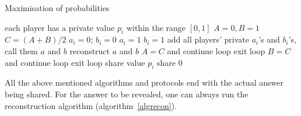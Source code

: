\begin{algorithm}
\caption{Maximisation of probabilities}
\label{algmax}
\begin{algorithmic}
\REQUIRE each player has a private value $p_{i}$ within the range $[0,1]$
\STATE $A = 0, B = 1$
\LOOP
\STATE $C = (A + B) / 2$
	\STATE $a_{i} = 0 $; $b_{i} = 0$
		\STATE $a_{i} = 1 $
	\ELSE
		\STATE $ b_{i} = 1$
	\ENDIF
	\STATE {}
	\STATE add all players' private $a_{i}$'s and $b_{i}$'s, call them $a$ and $b$
	\STATE reconstruct $a$ and $b$
		\STATE $A = C$ and continue loop
		\STATE exit loop 
		\STATE $B = C$ and continue loop
	\ELSE
		\STATE exit loop 
	\ENDIF
\ENDFOR
\ENDLOOP
\STATE {}
		\STATE share value $p_{i}$
	\ELSE
		\STATE share $0$
	\ENDIF
\ENDFOR
\end{algorithmic}
\end{algorithm}



All the above mentioned algorithms and protocols end with the actual answer being shared. 
For the answer to be revealed, one can always run the reconstruction algorithm (algorithm~\ref{algrecon}).


